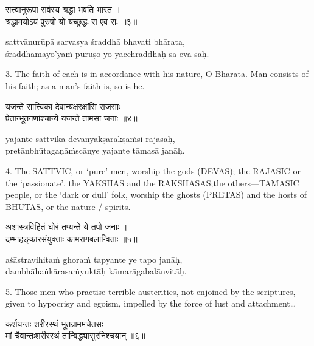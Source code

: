 \begin{gitaverse}
सत्त्वानुरूपा सर्वस्य श्रद्धा भवति भारत । \\
श्रद्धामयोऽयं पुरुषो यो यच्छ्रद्धः स एव सः ॥३॥
\end{gitaverse}

\begin{transliteration}
sattvānurūpā sarvasya śraddhā bhavati bhārata, \\
śraddhāmayo'yaṁ puruṣo yo yacchraddhaḥ sa eva saḥ.
\end{transliteration}

3. The faith of each is in accordance with his nature, O Bharata. Man consists
of his faith; as a man's faith is, so is he.

\begin{gitaverse}
यजन्ते सात्त्विका देवान्यक्षरक्षांसि राजसाः । \\
प्रेतान्भूतगणांश्चान्ये यजन्ते तामसा जनाः ॥४॥
\end{gitaverse}

\begin{transliteration}
yajante sāttvikā devānyakṣarakṣāṁsi rājasāḥ, \\
pretānbhūtagaṇāṁscānye yajante tāmasā janāḥ.
\end{transliteration}

4. The SATTVIC, or `pure' men, worship the gods (DEVAS); the RAJASIC or the
`passionate', the YAKSHAS and the RAKSHASAS;\@ the others---TAMASIC people, or
the `dark or dull' folk, worship the ghosts (PRETAS) and the hosts of BHUTAS,
or the nature / spirits.

\begin{gitaverse}
अशास्त्रविहितं घोरं तप्यन्ते ये तपो जनाः । \\
दम्भाहङ्कारसंयुक्ताः कामरागबलान्विताः ॥५॥
\end{gitaverse}

\begin{transliteration}
aśāstravihitaṁ ghoraṁ tapyante ye tapo janāḥ, \\
dambhāhaṅkārasaṁyuktāḥ kāmarāgabalānvitāḥ.
\end{transliteration}

5. Those men who practise terrible austerities, not enjoined by the scriptures,
given to hypocrisy and egoism, impelled by the force of lust and
attachment\ldots

\begin{gitaverse}
कर्शयन्तः शरीरस्थं भूतग्राममचेतसः । \\
मां चैवान्तःशरीरस्थं तान्विद्ध्यासुरनिश्चयान् ॥६॥
\end{gitaverse}

